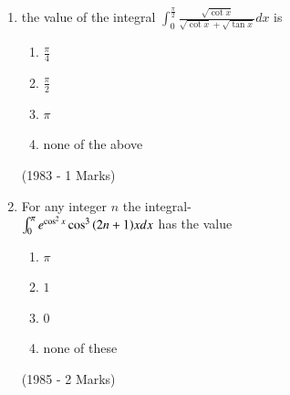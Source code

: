 \documentclass[journal,12pt,twocolumn]{IEEEtran}
\theoremstyle{remark}
\begin{document}
\begin{enumerate}
\begin{enumerate}
			\item none of the above
		        \end{enumerate}
		\hfill{(1982 - 2 Marks)}
	\item the value of the integral $\int_0^{\frac{\pi}{2}} \frac{\sqrt{\cot x}}{\sqrt{\cot x}+\sqrt{\tan x}}dx$ is 
	                \begin{enumerate}
			\item $\frac{\pi}{4}$
		\item$\frac{\pi}{2}$
			\item$\pi$
		\item none of the above
		         \end{enumerate}
		\hfill{(1983 - 1 Marks)}
	\item For any integer $n$ the integral-\\
		$\int_0^{\pi} e^{\cos^2 x} \cos ^3 {\left(2n+1\right)}xdx$ has the value
                        \begin{enumerate}
			\item	$\pi$
			\item $1$
			\item $0$
			\item none of these
		        \end{enumerate}
		\hfill{(1985 - 2 Marks)}
\end{enumerate}
\end{document}
